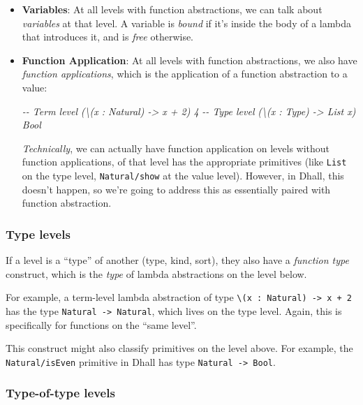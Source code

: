 \documentclass[]{article}
\newenvironment{Shaded}{}{}
\newcommand{\CommentTok}[1]{\textcolor[rgb]{0.38,0.63,0.69}{\textit{#1}}}
\begin{document}
\begin{itemize}
\item
  \textbf{Variables}: At all levels with function abstractions, we can talk
  about \emph{variables} at that level. A variable is \emph{bound} if it's
  inside the body of a lambda that introduces it, and is \emph{free} otherwise.
\item
  \textbf{Function Application}: At all levels with function abstractions, we
  also have \emph{function applications}, which is the application of a function
  abstraction to a value:

\begin{Shaded}
\begin{Highlighting}[]
\CommentTok{{-}{-} Term level}
\CommentTok{(\textbackslash{}(x : Natural) {-}\textgreater{} x + 2) 4}
\CommentTok{{-}{-} Type level}
\CommentTok{(\textbackslash{}(x : Type) {-}\textgreater{} List x) Bool}
\end{Highlighting}
\end{Shaded}

  \emph{Technically}, we can actually have function application on levels
  without function applications, of that level has the appropriate primitives
  (like \texttt{List} on the type level, \texttt{Natural/show} at the value
  level). However, in Dhall, this doesn't happen, so we're going to address this
  as essentially paired with function abstraction.
\end{itemize}

\subsubsection{Type levels}\label{type-levels}

If a level is a ``type'' of another (type, kind, sort), they also have a
\emph{function type} construct, which is the \emph{type} of lambda abstractions
on the level below.

For example, a term-level lambda abstraction of type
\texttt{\textbackslash{}(x\ :\ Natural)\ -\textgreater{}\ x\ +\ 2} has the type
\texttt{Natural\ -\textgreater{}\ Natural}, which lives on the type level.
Again, this is specifically for functions on the ``same level''.

This construct might also classify primitives on the level above. For example,
the \texttt{Natural/isEven} primitive in Dhall has type
\texttt{Natural\ -\textgreater{}\ Bool}.

\subsubsection{Type-of-type levels}\label{type-of-type-levels}
\end{document}
